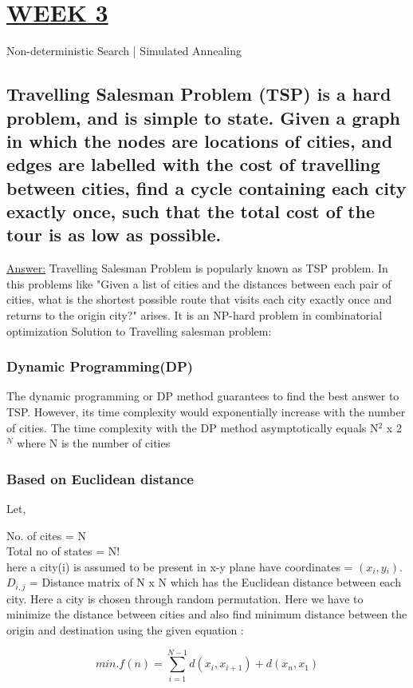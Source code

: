 \documentclass[15pt,journal]{IEEEtran}
\begin{document}
\newpage
\section{\large{\underline{WEEK 3}}}
Non-deterministic Search | Simulated Annealing

\subsection{Travelling Salesman Problem (TSP) is a hard problem, and is simple to state.  Given a  graph in which the nodes are locations of cities, and edges are labelled with the cost of travelling between cities,  find a cycle containing each city exactly once, such that the total cost of the tour is as low as possible.}

\underline{Answer:}
Travelling Salesman Problem is popularly  known as TSP problem. In this problems like "Given a list of cities and the distances between each pair of cities, what is the shortest possible route that visits each city exactly once and returns to the origin city?" arises. It is an NP-hard problem in combinatorial optimization
Solution to Travelling salesman problem:
\subsubsection{Dynamic Programming(DP)}
The dynamic programming or DP method guarantees to find the best answer to TSP. However, its time complexity would exponentially increase with the number of cities. The time complexity with the DP method asymptotically equals N{$^{2}$} x 2{$^{N}$} where N is the number of cities
\subsubsection{Based on Euclidean distance} 
Let,

No. of cites = N
\\Total no of states = N!
\\here a city(i) is assumed to be present in x-y plane have coordinates = \((x {_{i}},y {_{i}})\).
\\\(D{_{i,j}}\) = Distance matrix of N x N which has the Euclidean distance between each city. Here a city is chosen through random permutation. Here we have to minimize the distance between cities and also find minimum distance between the origin and destination using the given equation :

\begin{equation}
  min.f(n) = \sum_{i=1}^{N-1}d(x {_{i}},x {_{i+1}}) + d(x {_{n}},x {_{1}})
    \label{equation:Tour Calculation Function}
\end{equation}
\end{document}
